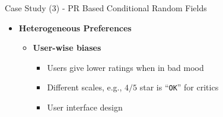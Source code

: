 \documentclass[
 size=14pt,
 paper=smartboard,  %
 mode=present, 		%
 display=slides, 	%
 style=tuliplab,  	%
 pauseslide,
 fleqn,leqno]{powerdot}{}
\begin{document}


\begin{slide}[toc=,bm=]{Case Study (3) - PR Based Conditional Random Fields}
	
	
	\begin{itemize}
		\item  \textbf{Heterogeneous Preferences}
		
		\begin{itemize}
			\item \textbf{User-wise biases}
			\begin{itemize}
				\item Users give lower ratings when in bad mood
				
				\item Different scales, e.g., $4/5$ star is ``\texttt{OK}'' for critics
				
				\item User interface design
				

\end{itemize}
\end{itemize}
\end{itemize}
\end{slide}
\end{document}
